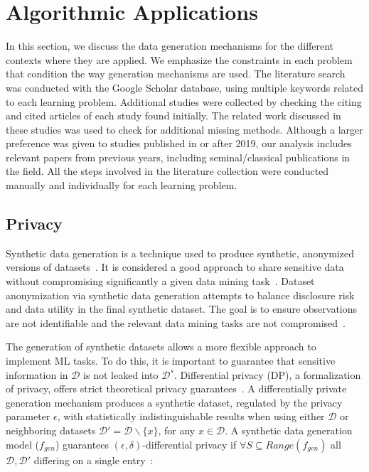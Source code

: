 \section{Algorithmic Applications}\label{sec:algorithmic-applications}

In this section, we discuss the data generation mechanisms for the different
contexts where they are applied. We emphasize the constraints in each problem
that condition the way generation mechanisms are used. The literature search
was conducted with the Google Scholar database, using multiple keywords
related to each learning problem. Additional studies were collected by
checking the citing and cited articles of each study found initially. The
related work discussed in these studies was used to check for additional missing
methods. Although a larger preference was given to studies published in or
after 2019, our analysis includes relevant papers from previous years,
including seminal/classical publications in the field. All the steps involved
in the literature collection were conducted manually and individually for each
learning problem.

\subsection{Privacy}\label{sec:data-privacy}

Synthetic data generation is a technique used to produce synthetic, anonymized
versions of datasets~\cite{dankar2021fake}. It is considered a good approach
to share sensitive data without compromising significantly a given data mining
task~\cite{taub2018differential, park2018data}. Dataset anonymization via synthetic
data generation attempts to balance disclosure risk and data utility in the
final synthetic dataset. The goal is to ensure observations are not
identifiable and the relevant data mining tasks are not
compromised~\cite{singh2017aggregating, li2018privacy}.

The generation of synthetic datasets allows a more flexible approach to
implement ML tasks. To do this, it is important to guarantee that sensitive
information in $\mathcal{D}$ is not leaked into $\mathcal{D}^s$. Differential
privacy (DP), a formalization of privacy, offers strict theoretical privacy
guarantees~\cite{rosenblatt2020differentially}. A differentially private
generation mechanism produces a synthetic dataset, regulated by the privacy
parameter $\epsilon$, with statistically indistinguishable results when using
either $\mathcal{D}$ or neighboring datasets $\mathcal{D}' = \mathcal{D}
\backslash \{x\}$, for any $x \in \mathcal{D}$. A synthetic data generation
model ($f_{gen}$) guarantees $(\epsilon, \delta)$-differential privacy if
$\forall S \subseteq Range(f_{gen})$ all $\mathcal{D}, \mathcal{D}'$ differing
on a single entry~\cite{hardt2012simple}:

